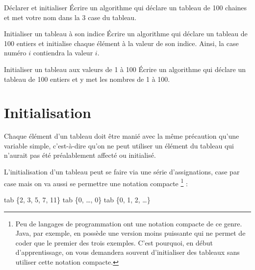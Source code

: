 		\begin{Exercice}{Déclarer et initialiser}
			Écrire un algorithme qui déclare un tableau de 100 chaines
			et met votre nom dans la 3\ieme{} case du tableau.
		\end{Exercice}
	
		\begin{Exercice}{Initialiser un tableau à son indice}
			Écrire un algorithme qui déclare un tableau de 100 entiers
			et initialise chaque élément à la valeur de son indice.
			Ainsi, la case numéro $i$ contiendra la valeur $i$.
		\end{Exercice}

		\begin{Exercice}{Initialiser un tableau aux valeurs de 1 à 100}
			Écrire un algorithme qui déclare un tableau de 100 entiers
			et y met les nombres de 1 à 100.
		\end{Exercice}
		
	\section{Initialisation}

		Chaque élément d'un tableau
		doit être manié avec la même précaution 
		qu’une variable simple, 
		c’est-à-dire qu’on ne peut utiliser un élément du tableau 
		qui n’aurait pas été préalablement affecté ou initialisé.

		L'initialisation d'un tableau peut se faire 
		via une série d'assignations, case par case
		mais on va aussi se permettre une notation compacte%
		\footnote{
			Peu de langages de programmation 
			ont une notation compacte de ce genre. 
			Java, par exemple, en possède une version moins puissante
			qui ne permet de coder que le premier des trois exemples.
			C'est pourquoi, en début d'apprentissage, 
			on vous demandera souvent d'initialiser des tableaux
			sans utiliser cette notation compacte.
		} :
		
		\begin{LDA}
			\Let tab \Gets \{2, 3, 5, 7, 11\} 
			\Let tab \Gets \{0, \dots, 0\} 
			\Let tab \Gets \{0, 1, 2, \dots\} 
		\end{LDA}


